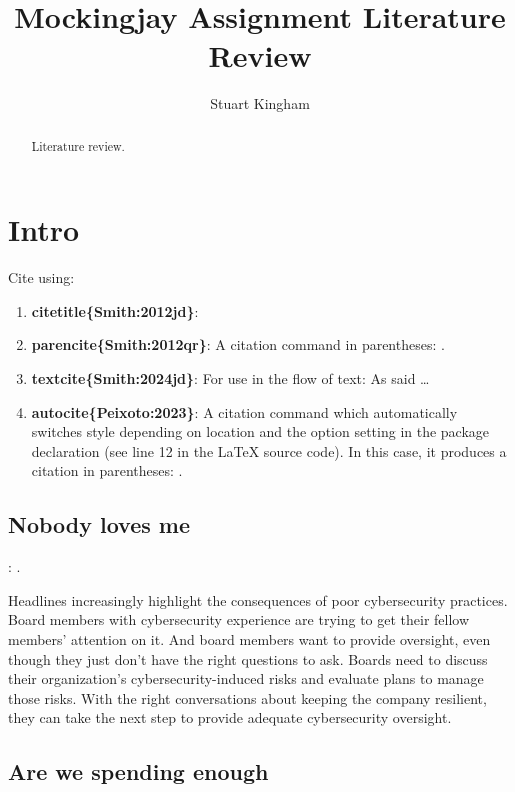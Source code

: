 \documentclass{article}
\title{Mockingjay Assignment Literature Review}
\author{Stuart Kingham}
\begin{document}
\maketitle

\begin{abstract}
Literature review.
\end{abstract}

\tableofcontents

\section{Intro}

Cite using:
\begin{enumerate}
\item \textbf{citetitle\{Smith:2012jd\}}: 
\item \textbf{parencite\{Smith:2012qr\}}: A citation command in parentheses: \parencite{Smith:2023qr}.
\item \textbf{textcite\{Smith:2024jd\}}: For use in the flow of text: As \textcite{Smith:2024jd} said \dots
\item \textbf{autocite\{Peixoto:2023\}}: A citation command which automatically switches style depending on
  location and the option setting in the package declaration (see line 12 in the LaTeX source code). In this
  case, it produces a citation in parentheses: \autocite{Peixoto:2023}.
\end{enumerate}

\subsection{Nobody loves me}

\textbf{}: \textcite{Milica:2023}.

Headlines increasingly highlight the consequences of poor cybersecurity practices. Board members with cybersecurity experience are trying to get their fellow members’ attention on it. And board members want to provide oversight, even though they just don’t have the right questions to ask. Boards need to discuss their organization’s cybersecurity-induced risks and evaluate plans to manage those risks. With the right conversations about keeping the company resilient, they can take the next step to provide adequate cybersecurity oversight.

\subsection{Are we spending enough}
\end{document}
